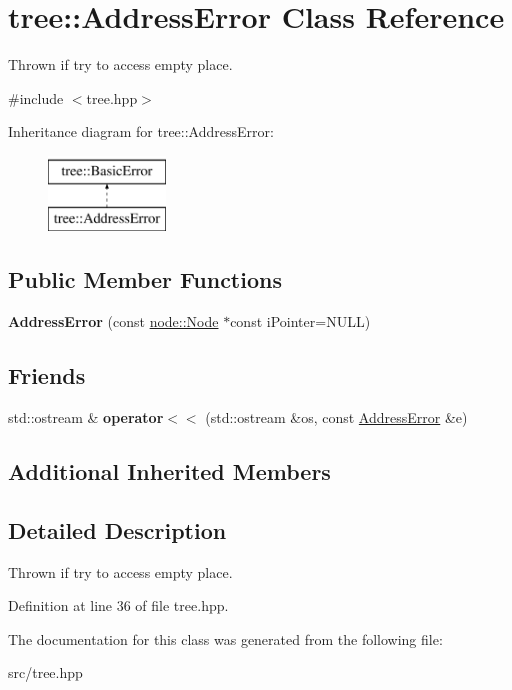 \hypertarget{classtree_1_1AddressError}{\section{tree\-:\-:Address\-Error Class Reference}
\label{classtree_1_1AddressError}
}


Thrown if try to access empty place.  




{\ttfamily \#include $<$tree.\-hpp$>$}

Inheritance diagram for tree\-:\-:Address\-Error\-:\begin{figure}[H]
\begin{center}
\leavevmode
\includegraphics[height=2.000000cm]{classtree_1_1AddressError}
\end{center}
\end{figure}
\subsection*{Public Member Functions}
\begin{DoxyCompactItemize}
\item 
\hypertarget{classtree_1_1AddressError_a7aab83b45916e564f655344d25e5ebca}{{\bfseries Address\-Error} (const \hyperlink{classnode_1_1Node}{node\-::\-Node} $\ast$const i\-Pointer=N\-U\-L\-L)}\label{classtree_1_1AddressError_a7aab83b45916e564f655344d25e5ebca}

\end{DoxyCompactItemize}
\subsection*{Friends}
\begin{DoxyCompactItemize}
\item 
\hypertarget{classtree_1_1AddressError_a979849bdcb8ad88734190c5e012c1cff}{std\-::ostream \& {\bfseries operator$<$$<$} (std\-::ostream \&os, const \hyperlink{classtree_1_1AddressError}{Address\-Error} \&e)}\label{classtree_1_1AddressError_a979849bdcb8ad88734190c5e012c1cff}

\end{DoxyCompactItemize}
\subsection*{Additional Inherited Members}


\subsection{Detailed Description}
Thrown if try to access empty place. 

Definition at line 36 of file tree.\-hpp.



The documentation for this class was generated from the following file\-:\begin{DoxyCompactItemize}
\item 
src/tree.\-hpp\end{DoxyCompactItemize}
